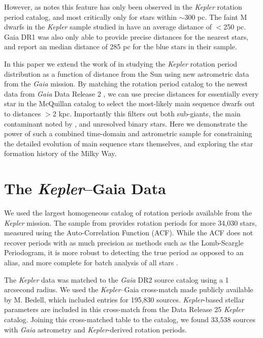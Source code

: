 \documentclass[preprint2]{aastex62}
\newcommand{\Kepler}{\textsl{Kepler}\xspace}
\begin{document}
However, as \citet{davenport2017} notes this feature has only been observed in the \Kepler rotation period catalog, and most critically only for stars within $\sim$300 pc. The faint M dwarfs in the \Kepler sample studied in \citet{mcquillan2013} have an average distance of $<$250 pc. Gaia DR1 was also only able to provide precise distances for the nearest stars, and \citet{davenport2017} report an median distance of 285 pc for the blue stars in their sample. 



In this paper we extend the work of \citet{davenport2017} in studying the \Kepler rotation period distribution as a function of distance from the Sun using new astrometric data from the {\em Gaia} mission. 
By matching the \citet{mcquillan2014} rotation period catalog to the newest data from {\em Gaia} Data Release 2 \citep{gaia_dr2}, we can use precise distances for essentially every star in the McQuillan catalog to select the most-likely main sequence dwarfs out to distances $>$2 kpc. Importantly this filters out both sub-giants, the main contaminant noted by \cite{davenport2017}, and unresolved binary stars.
Here we demonstrate the power of such a combined time-domain and astrometric sample for constraining the detailed evolution of main sequence stars themselves, and exploring the star formation history of the Milky Way.
 



\section{The \Kepler--Gaia Data}

We used the largest homogeneous catalog of rotation periods available from the \Kepler mission. The sample from \citet{mcquillan2014} provides rotation periods for more 34,030 stars, measured using the Auto-Correlation Function (ACF). While the ACF does not recover periods with as much precision as methods such as the Lomb-Scargle Periodogram, it is more robust to detecting the true period as opposed to an alias, and more complete for batch analysis of all stars \citep[e.g. see][]{aigrain2015}.

The \Kepler data was matched to the {\em Gaia} DR2 source catalog using a 1 arcsecond radius. We used the \Kepler--Gaia cross-match made publicly available by M. Bedell, which included entries for 195,830 sources. \Kepler-based stellar parameters are included in this cross-match from the Data Release 25 \Kepler catalog. Joining this cross-matched table to the \citet{mcquillan2014} catalog, we found 33,538 sources with {\em Gaia} astrometry and \Kepler-derived rotation periods.
\end{document}
